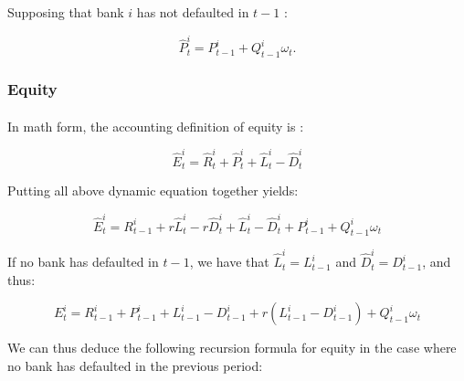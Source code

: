 \documentclass{article}
\newcommand{\wh}{\widehat}
\begin{document}
Supposing that bank $i$ has not defaulted in $t-1$ :

\begin{equation}\label{eq:ptf}
\widehat{P}_t^{i} = P_{t-1}^{i} + Q_{t-1}^i \omega_t.
\end{equation}

     



\subsubsection{Equity}

\paragraph{}
In math form, the accounting definition of equity is : 

\begin{equation}\label{eq:eqtdef}
\wh E^i_t = \wh R^i_t + \wh P_t^i + \wh L^i_t - \wh D^i_t
\end{equation}

Putting all above dynamic equation together yields: 


$$ \wh E^i_t = R_{t-1}^i + r \wh L_t^i - r \wh D_t^i + \wh L^i_t - \wh D^i_t + P_{t-1}^i + Q_{t-1}^i \omega_t$$


If no bank has defaulted in $t-1$, we have that $\wh L^i_t = L^i_{t-1}$ and $ \wh D^i_t = D^i_{t-1}$, and thus:


$$E^i_t = R_{t-1}^i + P_{t-1}^{i} + L^i_{t-1} - D^i_{t-1} + r (L_{t-1}^i - D_{t-1}^i) + Q_{t-1}^i \omega_t$$

We can thus deduce the following recursion formula for equity in the case where no bank has defaulted in the previous period: 

\end{document}
